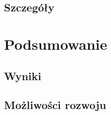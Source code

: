 \documentclass{mini}
\begin{document}
\subsection{Szczegóły}

\pagebreak

\section{Podsumowanie}

\subsection{Wyniki}

\subsection{Możliwości rozwoju}

\pagebreak

\begin{thebibliography}{9}

\end{thebibliography}

\makestatement
\end{document}
